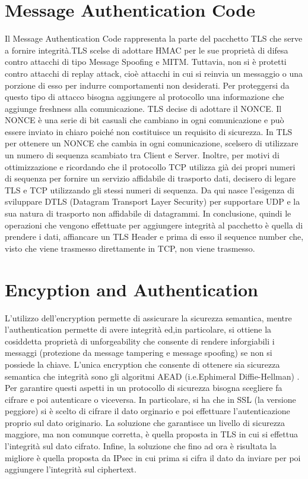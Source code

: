 \documentclass{article}
\begin{document}
\section{Message Authentication Code}
Il Message Authentication Code rappresenta la parte del pacchetto TLS che serve a fornire integrità\@.TLS scelse di adottare HMAC per le sue proprietà di difesa contro attacchi di tipo Message Spoofing e MITM\@. Tuttavia, non si è protetti contro attacchi di replay attack, cioè attacchi in cui si reinvia un messaggio o una porzione di esso per indurre comportamenti non desiderati\@.
Per proteggersi da questo tipo di attacco bisogna aggiungere al protocollo una informazione che aggiunge freshness alla comunicazione\@. TLS decise di adottare il NONCE\@.
Il NONCE è una serie di bit casuali che cambiano in ogni comunicazione e può essere inviato in chiaro poiché non costituisce un requisito di sicurezza. In TLS per ottenere un NONCE che cambia in ogni comunicazione, scelsero di utilizzare un numero di sequenza scambiato tra Client e Server. Inoltre, per motivi di ottimizzazione e ricordando che il protocollo TCP utilizza già dei propri numeri di sequenza per fornire un servizio affidabile di trasporto dati, decisero di legare TLS e TCP utilizzando gli stessi numeri di sequenza\@.
Da qui nasce l'esigenza di sviluppare DTLS (Datagram Transport Layer Security) per supportare UDP e la sua natura di trasporto non affidabile di datagrammi\@.\newline
In conclusione, quindi le operazioni che vengono effettuate per aggiungere integrità al pacchetto è quella di prendere i dati, affiancare un TLS Header e prima di esso il sequence number che, visto che viene trasmesso direttamente in TCP, non viene trasmesso.
\section{Encyption and Authentication}
L'utilizzo dell'encryption permette di assicurare la sicurezza semantica, mentre l'authentication permette di avere integrità ed,in particolare, si ottiene la cosiddetta proprietà di unforgeability che consente di rendere inforgiabili i messaggi (protezione da message tampering e message spoofing) se non si possiede la chiave\@.
L'unica encryption che consente di ottenere sia sicurezza semantica che integrità sono gli algoritmi AEAD (i.e.Ephimeral Diffie-Hellman) \@.
Per garantire questi aspetti in un protocollo di sicurezza bisogna scegliere fa cifrare e poi autenticare o viceversa. In particolare, si ha che in SSL (la versione peggiore) si è scelto di cifrare il dato orginario e poi effettuare l'autenticazione proprio sul dato originario. La soluzione che garantisce un livello di sicurezza maggiore, ma non comunque corretta, è quella proposta in TLS in cui si effettua l'integrità sul dato cifrato\@. Infine, la soluzione che fino ad ora è risultata la migliore è quella proposta da IPsec in cui prima si cifra il dato da inviare per poi aggiungere l'integrità sul ciphertext.
\end{document}
